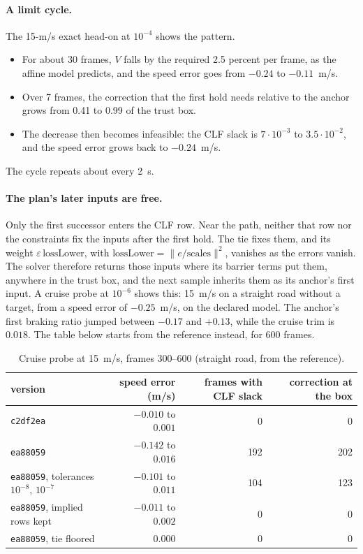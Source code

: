 \documentclass[11pt]{article}
\begin{document}
\paragraph{A limit cycle.}
The 15-m/s exact head-on at $10^{-4}$ shows the pattern.
\begin{itemize}
\item For about 30 frames, $V$ falls by the required 2.5 percent per
  frame, as the affine model predicts, and the speed error goes from $-0.24$
  to $-0.11$~m/s.
\item Over 7 frames, the correction that the first hold needs relative to
  the anchor grows from 0.41 to 0.99 of the trust box.
\item The decrease then becomes infeasible: the CLF slack is $7\cdot10^{-3}$
  to $3.5\cdot10^{-2}$, and the speed error grows back to $-0.24$~m/s.
\end{itemize}
The cycle repeats about every 2~s.

\paragraph{The plan's later inputs are free.}
Only the first successor enters the CLF row. Near the path, neither that row
nor the constraints fix the inputs after the first hold. The tie fixes them,
and its weight $\varepsilon\,\mathrm{lossLower}$, with
$\mathrm{lossLower}=\|e/\text{scales}\|^2$, vanishes as the errors vanish.
The solver therefore returns those inputs where its barrier terms put them,
anywhere in the trust box, and the next sample inherits them as its anchor's
first input. A cruise probe at $10^{-6}$ shows this: 15~m/s on a straight
road without a target, from a speed error of $-0.25$~m/s, on the declared
model. The anchor's first braking ratio jumped between $-0.17$ and $+0.13$,
while the cruise trim is $0.018$. The table below starts from the
reference instead, for 600 frames.

\begin{table}[h]
\centering\small
\caption{Cruise probe at 15~m/s, frames 300--600 (straight road, from the
reference).}
\begin{tabular}{lrrr}
\toprule
version & speed error (m/s) & frames with CLF slack & correction at the box\\
\midrule
\texttt{c2df2ea} & $-0.010$ to $0.001$ & 0 & 0\\
\texttt{ea88059} & $-0.142$ to $0.016$ & 192 & 202\\
\texttt{ea88059}, tolerances $10^{-8}$, $10^{-7}$ & $-0.101$ to $0.011$ & 104 & 123\\
\texttt{ea88059}, implied rows kept & $-0.011$ to $0.002$ & 0 & 0\\
\texttt{ea88059}, tie floored & 0.000 & 0 & 0\\
\bottomrule
\end{tabular}
\end{table}
\end{document}
